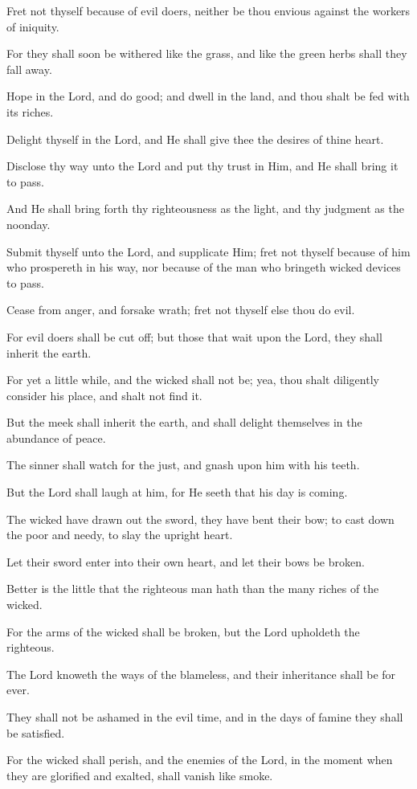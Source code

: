 Fret not thyself because of evil doers, neither be thou envious against the workers of iniquity.

For they shall soon be withered like the grass, and like the green herbs shall they fall away.

Hope in the Lord, and do good; and dwell in the land, and thou shalt be fed with its riches.

Delight thyself in the Lord, and He shall give thee the desires of thine heart.

Disclose thy way unto the Lord and put thy trust in Him, and He shall bring it to pass.

And He shall bring forth thy righteousness as the light, and thy judgment as the noonday.

Submit thyself unto the Lord, and supplicate Him; fret not thyself because of him who prospereth in his way, nor because of the man who bringeth wicked devices to pass.

Cease from anger, and forsake wrath; fret not thyself else thou do evil.

For evil doers shall be cut off; but those that wait upon the Lord, they shall inherit the earth.

For yet a little while, and the wicked shall not be; yea, thou shalt diligently consider his place, and shalt not find it.

But the meek shall inherit the earth, and shall delight themselves in the abundance of peace.

The sinner shall watch for the just, and gnash upon him with his teeth.

But the Lord shall laugh at him, for He seeth that his day is coming.

The wicked have drawn out the sword, they have bent their bow; to cast down the poor and needy, to slay the upright heart.

Let their sword enter into their own heart, and let their bows be broken.

Better is the little that the righteous man hath than the many riches of the wicked.

For the arms of the wicked shall be broken, but the Lord upholdeth the righteous.

The Lord knoweth the ways of the blameless, and their inheritance shall be for ever.

They shall not be ashamed in the evil time, and in the days of famine they shall be satisfied.

For the wicked shall perish, and the enemies of the Lord, in the moment when they are glorified and exalted, shall vanish like smoke.

